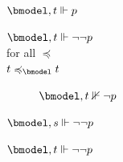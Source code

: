 \begin{example}
\begin{figure}
\begin{center}
{\begin{minipage}[t]{.45\textwidth}
\begin{enumerate}[label=(\alph*),leftmargin=*]
\begin{description}
\begin{description}
\begin{description}
\begin{description}
                          \begin{description}
                            \item[$\bmodel, t \Vdash p$] 
                          \end{description}
                      \end{description}
                  \end{description}
                \item[$s \R_{\bmodel} t$]\hfil
                  \begin{description}
                    \item[$\bmodel, t \Vdash \lnot\lnot p$]
                    \item[for all $\preccurlyeq$]
                    \item[$t \preccurlyeq_{\bmodel} t$]\hfil
                      \begin{description}
                        \item[$\bmodel, t \nVdash \lnot p$] 
                      \end{description}
                  \end{description}
              \end{description}
            \item[$s \preccurlyeq_{\bmodel} t$]\hfil
              \begin{description}\setlength{\itemsep}{0pt}
                \item[for all $\Box$]
                \item[$t \R_{\bmodel} s$]\hfil
                  \begin{description}
                    \item[$\bmodel, s \Vdash \lnot\lnot p$]
                  \end{description}
                \item[$t \R_{\bmodel} t$]\hfil
                  \begin{description}
                    \item[$\bmodel, t \Vdash \lnot\lnot p$]
                  \end{description}
              \end{description}
          \end{description}
        \end{enumerate}
      \end{minipage}
      \hfill
      \begin{minipage}[t]{.55\textwidth}

\end{minipage}}
\end{center}
\end{figure}
\end{example}
